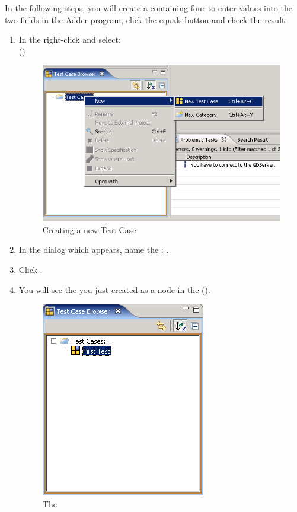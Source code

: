 In the following steps, you will create a \gdcase{} containing four \gdsteps{} to enter values into the two fields in the Adder program, click the equals button and check the result.    

\begin{enumerate}
 \item In the \gdtestcasebrowser{} right-click and select:\\  ()

\begin{figure}[h]
\begin{center}
\includegraphics{Tutorials/PS/TutNewTestCase}
\caption{Creating a new Test Case}
\label{TutNewTestCase}
\end{center}
\end{figure}


 \item In the dialog which appears, name the \gdcase{}: .
 \item Click . 
 \item You will see the \gdcase{} you just created as a node in the \gdtestcasebrowser{} ().

\begin{figure}[h]
\begin{center}
\includegraphics{Tutorials/PS/TutCaseInBrowser}
\caption{The \gdtestcasebrowser{}}
\label{TutCaseInBrowser}
\end{center}
\end{figure}
 

\end{enumerate}
